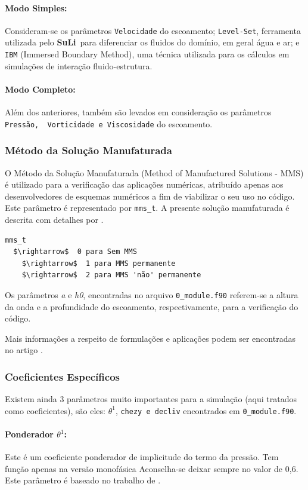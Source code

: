 \documentclass[12pt, a4paper]{article}
\newcommand{\SL}{{\bf SuLi}}
\begin{document}
\paragraph{Modo Simples:} Consideram-se os parâmetros \verb|Velocidade| do escoamento; \verb|Level-Set|, ferramenta utilizada pelo \SL\ para diferenciar os fluidos do domínio, em geral água e ar; e \verb|IBM| (Immersed Boundary Method), uma técnica utilizada para os cálculos em simulações de interação fluido-estrutura.
\paragraph{Modo Completo:} Além dos anteriores, também são levados em consideração os parâmetros \verb|Pressão,  Vorticidade e Viscosidade| do escoamento.

\subsubsection{Método da Solução Manufaturada}
O Método da Solução Manufaturada (Method of Manufactured Solutions - MMS) é utilizado para a verificação das aplicações numéricas, atribuído apenas aos desenvolvedores de esquemas numéricos a fim de viabilizar o seu uso no código. Este parâmetro é representado por \verb|mms_t|. A presente solução manufaturada é descrita com detalhes por \cite{wang2009}.

\begin{lstlisting}[escapeinside='']
mms_t	
  $\rightarrow$  0 para Sem MMS
	$\rightarrow$  1 para MMS permanente
	$\rightarrow$  2 para MMS 'não' permanente
\end{lstlisting}

Os parâmetros \textit{a} e \textit{h0}, encontradas no arquivo \verb|0_module.f90| referem-se a altura da onda e a profundidade do escoamento, respectivamente, para a verificação do código.

Mais informações a respeito de formulações e aplicações podem ser encontradas no artigo \cite{monteiro2019}.

\subsubsection{Coeficientes Específicos}
Existem ainda 3 parâmetros muito importantes para a simulação (aqui tratados como coeficientes), são eles: $\theta^1$,  \verb|chezy e decliv| encontrados em \verb|0_module.f90|.

\paragraph{Ponderador $\theta^1$:} Este é um coeficiente ponderador de implicitude do termo da pressão. Tem função apenas na versão monofásica Aconselha-se deixar sempre no valor de 0,6. Este parâmetro é baseado no trabalho de \cite{patnaik1987}.
\end{document}
